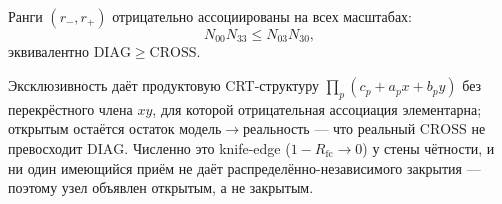 \begin{conjecture}\label{cnj:neg-assoc}
\red{} Ранги $(r_-,r_+)$ отрицательно ассоциированы на всех масштабах:
\begin{equation}\label{eq:neg-assoc}
N_{00}N_{33}\le N_{03}N_{30},
\end{equation}
эквивалентно $\mathrm{DIAG}\ge\mathrm{CROSS}$.
\end{conjecture}

Эксклюзивность даёт продуктовую CRT-структуру $\prod_p(c_p+a_p x+b_p y)$ без перекрёстного члена
$xy$, для которой отрицательная ассоциация элементарна; открытым остаётся остаток
модель$\to$реальность --- что реальный $\mathrm{CROSS}$ не превосходит $\mathrm{DIAG}$. Численно это
knife-edge ($1-R_{\mathrm{fc}}\to 0$) у стены чётности, и ни один имеющийся приём не даёт
распределённо-независимого закрытия --- поэтому узел объявлен открытым, а не закрытым.
